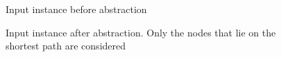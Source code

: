 \documentclass[runningheads]{llncs}
\begin{document}
\begin{figure}[h]
\begin{minipage}{.4\linewidth} 
\caption{Input instance before abstraction}
\label{fig:inst-bef-a}
\end{minipage}
\hspace{.1\linewidth}
\begin{minipage}{.4\linewidth} 
\caption{Input instance after abstraction. Only the nodes that lie on the shortest path are considered}
\label{fig:inst-aft-a}
\end{minipage}
\end{figure} 
\end{document}
